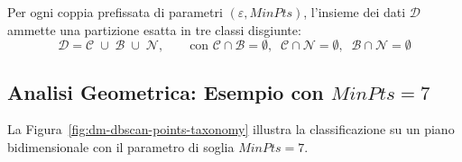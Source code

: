 \begin{property}
Per ogni coppia prefissata di parametri $(\varepsilon, MinPts)$, l'insieme dei dati $\mathcal{D}$ ammette una partizione esatta in tre classi disgiunte:
\begin{equation}
    \mathcal{D} = \mathcal{C} \;\cup\; \mathcal{B} \;\cup\; \mathcal{N}, \qquad \text{con } \mathcal{C} \cap \mathcal{B} = \emptyset, \;\; \mathcal{C} \cap \mathcal{N} = \emptyset, \;\; \mathcal{B} \cap \mathcal{N} = \emptyset
\end{equation}
\end{property}

\subsection{Analisi Geometrica: Esempio con \texorpdfstring{$MinPts = 7$}{MinPts = 7}}

La Figura~\ref{fig:dm-dbscan-points-taxonomy} illustra la classificazione su un piano bidimensionale con il parametro di soglia $MinPts = 7$.

